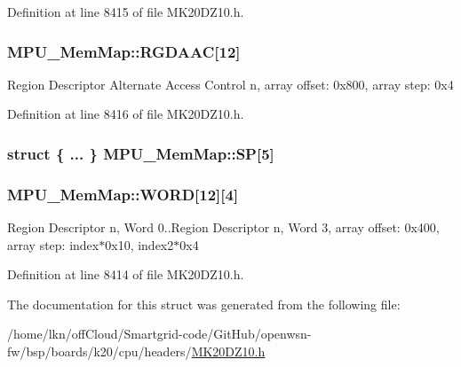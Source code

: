 Definition at line 8415 of file M\+K20\+D\+Z10.\+h.

\subsubsection[{\texorpdfstring{R\+G\+D\+A\+AC}{RGDAAC}}]{ M\+P\+U\+\_\+\+Mem\+Map\+::\+R\+G\+D\+A\+AC\mbox{[}12\mbox{]}}\hypertarget{struct_m_p_u___mem_map_a299d9ea041a2912c3cef5786c597796d}{}\label{struct_m_p_u___mem_map_a299d9ea041a2912c3cef5786c597796d}
Region Descriptor Alternate Access Control n, array offset\+: 0x800, array step\+: 0x4 

Definition at line 8416 of file M\+K20\+D\+Z10.\+h.

\subsubsection[{\texorpdfstring{SP}{SP}}]{\setlength{\rightskip}{0pt plus 5cm}struct \{ ... \}   M\+P\+U\+\_\+\+Mem\+Map\+::\+SP\mbox{[}5\mbox{]}}\hypertarget{struct_m_p_u___mem_map_addef87c9e6e975909fa0373f37f912dd}{}\label{struct_m_p_u___mem_map_addef87c9e6e975909fa0373f37f912dd}
\subsubsection[{\texorpdfstring{W\+O\+RD}{WORD}}]{ M\+P\+U\+\_\+\+Mem\+Map\+::\+W\+O\+RD\mbox{[}12\mbox{]}\mbox{[}4\mbox{]}}\hypertarget{struct_m_p_u___mem_map_a368e8f44db9da2769d43df7f33167d78}{}\label{struct_m_p_u___mem_map_a368e8f44db9da2769d43df7f33167d78}
Region Descriptor n, Word 0..Region Descriptor n, Word 3, array offset\+: 0x400, array step\+: index$\ast$0x10, index2$\ast$0x4 

Definition at line 8414 of file M\+K20\+D\+Z10.\+h.



The documentation for this struct was generated from the following file\+:\begin{DoxyCompactItemize}
\item 
/home/lkn/off\+Cloud/\+Smartgrid-\/code/\+Git\+Hub/openwsn-\/fw/bsp/boards/k20/cpu/headers/\hyperlink{_m_k20_d_z10_8h}{M\+K20\+D\+Z10.\+h}\end{DoxyCompactItemize}
